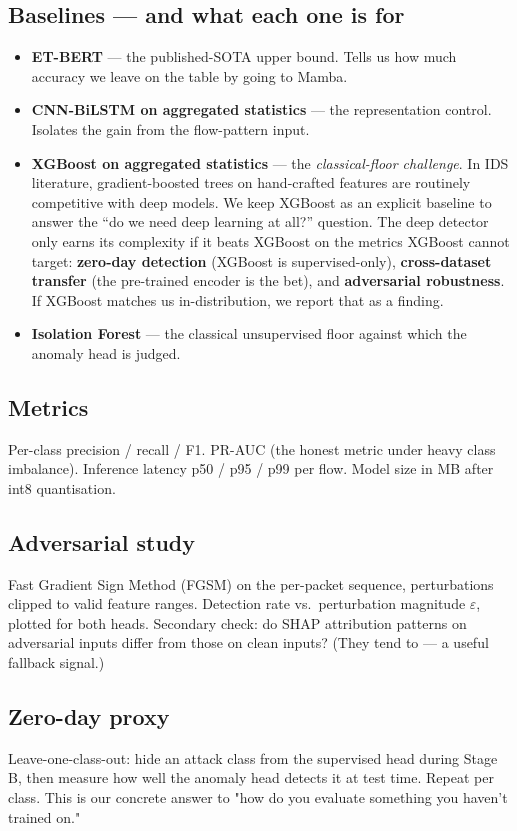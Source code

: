 \documentclass[11pt,a4paper]{article}
\begin{document}
\subsection{Baselines --- and what each one is for}
\begin{itemize}[leftmargin=*, itemsep=2pt]
  \item \textbf{ET-BERT} --- the published-SOTA upper bound. Tells us how much accuracy we leave on the table by going to Mamba.
  \item \textbf{CNN-BiLSTM on aggregated statistics} --- the representation control. Isolates the gain from the flow-pattern input.
  \item \textbf{XGBoost on aggregated statistics} --- the \emph{classical-floor challenge}. In IDS literature, gradient-boosted trees on hand-crafted features are routinely competitive with deep models. We keep XGBoost as an explicit baseline to answer the ``do we need deep learning at all?'' question. The deep detector only earns its complexity if it beats XGBoost on the metrics XGBoost cannot target: \textbf{zero-day detection} (XGBoost is supervised-only), \textbf{cross-dataset transfer} (the pre-trained encoder is the bet), and \textbf{adversarial robustness}. If XGBoost matches us in-distribution, we report that as a finding.
  \item \textbf{Isolation Forest} --- the classical unsupervised floor against which the anomaly head is judged.
\end{itemize}

\subsection{Metrics}
Per-class precision / recall / F1. PR-AUC (the honest metric under heavy class imbalance). Inference latency p50 / p95 / p99 per flow. Model size in MB after int8 quantisation.

\subsection{Adversarial study}
Fast Gradient Sign Method (FGSM) on the per-packet sequence, perturbations clipped to valid feature ranges. Detection rate vs.\ perturbation magnitude $\varepsilon$, plotted for both heads. Secondary check: do SHAP attribution patterns on adversarial inputs differ from those on clean inputs? (They tend to --- a useful fallback signal.)

\subsection{Zero-day proxy}
Leave-one-class-out: hide an attack class from the supervised head during Stage B, then measure how well the anomaly head detects it at test time. Repeat per class. This is our concrete answer to "how do you evaluate something you haven't trained on."
\end{document}
